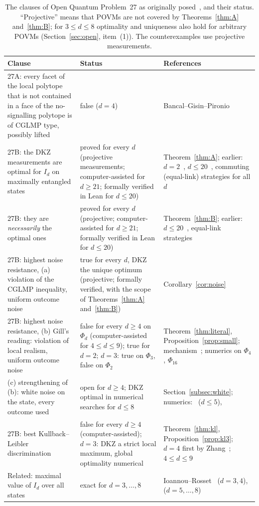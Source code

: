 \documentclass[11pt]{amsart}
\theoremstyle{definition}
\theoremstyle{remark}
\numberwithin{equation}{section}
\begin{document}
\begin{table}[ht]
\small
\begin{tabular}{@{}>{\raggedright\arraybackslash}p{}>{\raggedright\arraybackslash}p{}>{\raggedright\arraybackslash}p{}@{}}
\toprule
Clause & Status & References\\
\midrule
27A: every facet of the local polytope that is not contained in a face of the no-signalling polytope is of CGLMP
type, possibly lifted & false ($d=4$) & Bancal--Gisin--Pironio~\cite{BGP}\\
27B: the DKZ measurements are optimal for $I_d$ on maximally entangled states & proved for every $d$ (projective
measurements; computer-assisted for $d\ge21$; formally verified in Lean for $d\le20$) & Theorem~\ref{thm:A}; earlier:
$d=2$~\cite{Tsirelson}, $d\le20$~\cite{repo-cglmp}, commuting (equal-link) strategies for all $d$~\cite{MS-classical}\\
27B: they are \emph{necessarily} the optimal ones & proved for every $d$ (projective; computer-assisted for $d\ge21$;
formally verified in Lean for $d\le20$) & Theorem~\ref{thm:B}; earlier: $d\le20$~\cite{repo-cglmp}, equal-link
strategies~\cite{MS-classical}\\
27B: highest noise resistance, (a) violation of the CGLMP inequality, uniform outcome noise & true for every $d$, DKZ
the unique optimum (projective; formally verified, with the scope of Theorems~\ref{thm:A} and~\ref{thm:B}) &
Corollary~\ref{cor:noise}\\
27B: highest noise resistance, (b) Gill's reading: violation of local realism, uniform outcome noise & false for every
$d\ge4$ on $\Phi_d$ (computer-assisted for $4\le d\le9$); true for $d=2$; $d=3$: true on $\Phi_3$, false on $\Phi_2$ &
Theorem~\ref{thm:literal}, Proposition~\ref{prop:small}; mechanism~\cite{ADGL}; numerics on $\Phi_4$,
$\Phi_{16}$~\cite{BRL}\\
(c) strengthening of (b): white noise on the state, every outcome used & open for $d\ge4$; DKZ optimal in numerical
searches for $d\le8$ & Section~\ref{subsec:white}; numerics:~\cite{GLZ} ($d\le5$), \cite{repo-oqp27}\\
27B: best Kullback--Leibler discrimination & false for every $d\ge4$ (computer-assisted); $d=3$: DKZ a strict local
maximum, global optimality numerical & Theorem~\ref{thm:kl}, Proposition~\ref{prop:kl3}; $d=4$ first by
Zhang~\cite{Zhang}; $4\le d\le9$~\cite{repo-cglmp}\\
Related: maximal value of $I_d$ over all states & exact for $d=3,\dots,8$ & Ioannou--Rosset~\cite{IR} ($d=3,4$),
\cite{repo-cglmp} ($d=5,\dots,8$)\\
\bottomrule
\end{tabular}
\caption{The clauses of Open Quantum Problem~27 as originally posed~\cite{OQP}, and their status. ``Projective'' means
that POVMs are not covered by Theorems~\ref{thm:A} and~\ref{thm:B}; for $3\le d\le8$ optimality and uniqueness also hold for
arbitrary POVMs (Section~\ref{sec:open}, item~(1)). The counterexamples use projective measurements.}\label{tab:status}
\end{table}
\end{document}
